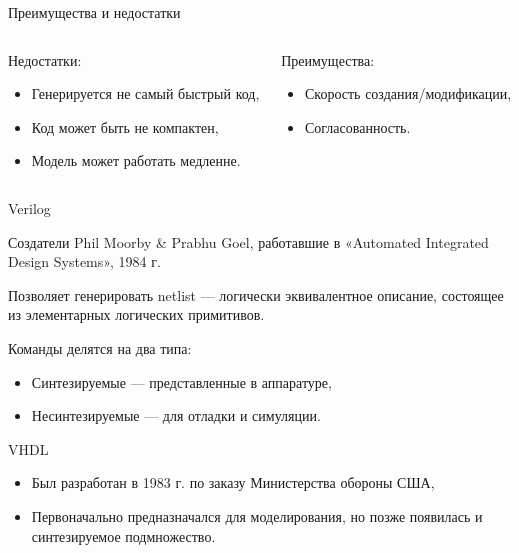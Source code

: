\begin{frame}{Преимущества и недостатки}

\begin{columns}[t]
    \begin{column}[T]{0.5\textwidth}
    Недостатки:
    \begin{itemize}
        \item Генерируется не самый быстрый код,
        \item Код может быть не компактен,
        \item Модель может работать медленне.
    \end{itemize}
    \end{column}
    \begin{column}[T]{0.5\textwidth}
    Преимущества:
    \begin{itemize}
        \item Скорость создания/модификации,
        \item Согласованность.
    \end{itemize}
    \end{column}
\end{columns}

\end{frame}

\begin{frame}{Verilog}

Создатели Phil Moorby \& Prabhu Goel, работавшие в «Automated Integrated Design Systems», 1984 г.

Позволяет генерировать netlist --- логически эквивалентное описание, состоящее из элементарных логических примитивов.

Команды делятся на два типа:

\begin{itemize}
    \item Синтезируемые --- представленные в аппаратуре,
    \item Несинтезируемые --- для отладки и симуляции.
\end{itemize}

\end{frame}

\begin{frame}{VHDL}

\begin{itemize}
    \item Был разработан в 1983 г. по заказу Министерства обороны США,
    \item Первоначально предназначался для моделирования, но позже появилась и синтезируемое подмножество.
\end{itemize}

\end{frame}

